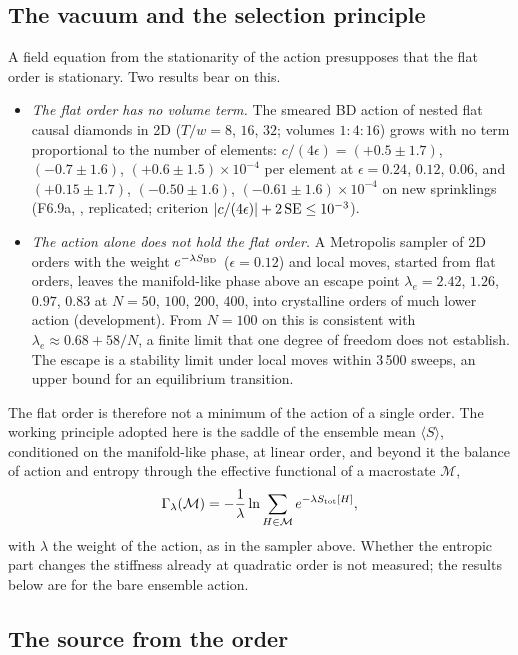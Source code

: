 \subsection{The vacuum and the selection principle}

A field equation from the stationarity of the action presupposes that the flat order is stationary. Two results
bear on this.
\begin{itemize}
\item \emph{The flat order has no volume term.} The smeared BD action of nested flat causal diamonds in 2D
  ($T/w=8$, $16$, $32$; volumes $1:4:16$) grows with no term proportional to the number of elements:
  $c/(4\epsilon)=(+0.5\pm1.7)$, $(-0.7\pm1.6)$, $(+0.6\pm1.5)\times10^{-4}$ per element at $\epsilon=0.24$,
  $0.12$, $0.06$, and $(+0.15\pm1.7)$, $(-0.50\pm1.6)$, $(-0.61\pm1.6)\times10^{-4}$ on new sprinklings (F6.9a,
  , replicated; criterion $|c/(4\epsilon)|+2\,{\rm SE}\le10^{-3}$).
\item \emph{The action alone does not hold the flat order.} A Metropolis sampler of 2D orders with the weight
  $e^{-\lambda S_{\mathrm{BD}}}$ ($\epsilon=0.12$) and local moves, started from flat orders, leaves the manifold-like phase
  above an escape point $\lambda_e=2.42$, $1.26$, $0.97$, $0.83$ at $N=50$, $100$, $200$, $400$, into crystalline orders
  of much lower action (development). From $N=100$ on this is consistent with $\lambda_e\approx0.68+58/N$, a finite
  limit that one degree of freedom does not establish. The escape is a stability limit under local moves within
  3\,500 sweeps, an upper bound for an equilibrium transition.
\end{itemize}
The flat order is therefore not a minimum of the action of a single order. The working principle
adopted here is the saddle of the ensemble mean $\langle S\rangle$, conditioned on the manifold-like phase, at
linear order, and beyond it the balance of action and entropy through the effective functional of a macrostate
$\mathcal M$,
\begin{equation}\label{eq:gammabeta}
  \Gamma_\lambda(\mathcal M)=-\frac1\lambda\ln\sum_{H\in\mathcal M}e^{-\lambda S_{\rm tot}[H]} ,
\end{equation}
with $\lambda$ the weight of the action, as in the sampler above.
Whether the entropic part changes the stiffness already at quadratic order is not measured; the results below are
for the bare ensemble action.

\subsection{The source from the order}

